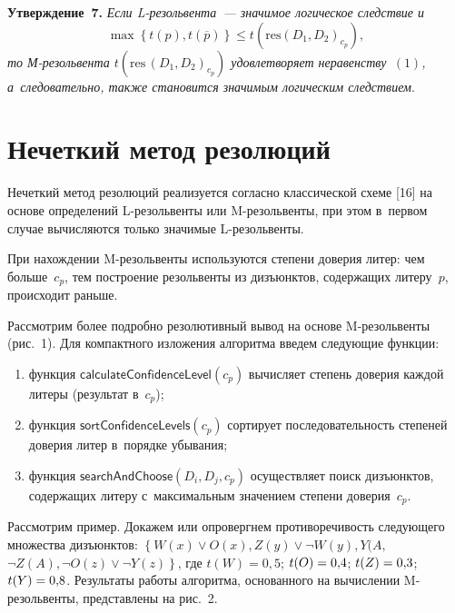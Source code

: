 \begin{multicols}{2}
  \smallskip
  
  \noindent
  \textbf{Утверждение~7.} \textit{Если L-ре\-золь\-вен\-та~--- значимое 
логическое следствие и
$$
\max \left\{ t(p), t\left(\overline{p}\right)\right\} \leq t\left( \mathrm{res}
\left(D_1, D_2\right)_{c_p}\right),
$$
 то М-ре\-золь\-вен\-та $t\left( \mathrm{res}\,(D_1,  D_2)_{c_p}\right)$ удовлетворяет неравенству~$(1)$, а~следовательно, также 
становится значимым логическим следствием}.

\section{Нечеткий метод резолюций}
  
  Нечеткий метод резолюций реализуется согласно классической схеме [16] на 
основе определений \mbox{L-ре}\-золь\-вен\-ты или \mbox{M-ре}\-золь\-вен\-ты, при этом 
в~первом случае вычисляются только значимые \mbox{L-ре}\-золь\-вен\-ты. 

При 
нахождении \mbox{M-ре}\-золь\-вен\-ты используются степени доверия литер: чем 
больше~$c_p$, тем построение резольвенты из дизъюнктов, содержащих 
литеру~$p$, происходит раньше. 

Рассмотрим более подробно резолютивный 
вывод на основе \mbox{M-ре}\-золь\-вен\-ты (рис.~1).  Для 
компактного изложения алгоритма введем следующие функции:
  \begin{enumerate}[(1)]
\item функция $\mathsf{calculateConfidenceLevel} (c_p)$ вычисляет степень 
доверия каждой литеры (результат в~$c_p$);
\item функция $\mathsf{sortConfidenceLevels} (c_p)$ сортирует 
последовательность степеней доверия литер в~порядке убывания;
\item функция $\mathsf{searchAndChoose} (D_i, D_j, c_p)$ осуществляет 
поиск дизъюнктов, содержащих литеру с~максимальным значением степени 
доверия~$c_p$. 
\end{enumerate}


  
  Рассмотрим пример. Докажем или опровергнем противоречивость 
следующего множества дизъюнктов:
$  \left\{
  W(x)\vee O(x), Z(y)\vee 
   \neg W(y), Y(A,\right.$\linebreak $\left. \neg Z(A), \neg O(z)\vee \neg 
Y(z)\right\}$,
где $t(W)=0{,}5$; $t(O)\hm= 0{,}4$; $t(Z)\hm= 0{,}3$; $t(Y)\hm= 0{,}8$. 
Результаты работы алгоритма, основанного на вычислении M-ре\-золь\-вен\-ты, 
представлены на рис.~2.



\end{multicols}
